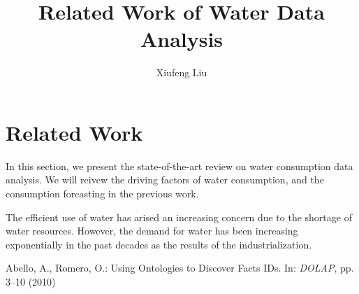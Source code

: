 \documentclass{llncs}
\begin{document}
\title{Related Work of Water Data Analysis}
\author{ Xiufeng Liu}
	
\maketitle



\section{Related Work}
\label{sec:relatedWorks}
In this section, we present the state-of-the-art review on water consumption data analysis. We will reivew the driving factors of water consumption, and the consumption forcasting in the previous work.

The efficient use of water has arised an increasing concern due to the shortage of water resources. However, the demand for water has been increasing exponentially in the past decades as the results of the industrialization. 


\begin{thebibliography}{1}
 Abello, A., Romero, O.: Using Ontologies to Discover Facts IDs. In: \emph{DOLAP}, pp. 3--10 (2010)


\end{thebibliography}
\end{document}
